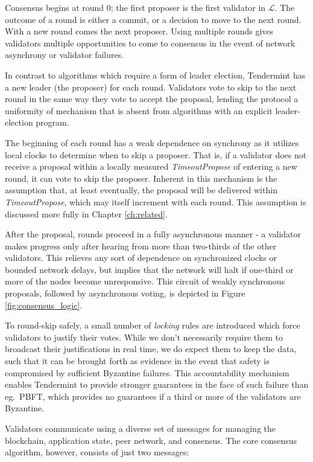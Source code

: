 Consensus begins at round 0; the first proposer is the first validator in $\mathcal{L}$.
The outcome of a round is either a commit, or a decision to move to the next round.
With a new round comes the next proposer.
Using multiple rounds gives validators multiple opportunities 
to come to consensus in the event of network asynchrony or validator failures.

In contrast to algorithms which require a form of leader election, 
Tendermint has a new leader (the proposer) for each round.
Validators vote to skip to the next round in the same way they vote to accept the proposal,
lending the protocol a uniformity of mechanism that is absent 
from algorithms with an explicit leader-election program.

The beginning of each round has a weak dependence on synchrony as it utilizes local clocks to determine when to skip a proposer.
That is, if a validator does not receive a proposal within a locally measured \emph{TimeoutPropose} of entering a new round, it can vote to skip the proposer.
Inherent in this mechanism is the assumption that, at least eventually, the proposal will be delivered within \emph{TimeoutPropose}, which may itself increment with each round.
This assumption is discussed more fully in Chapter \ref{ch:related}.

After the proposal, rounds proceed in a fully asynchronous manner - a validator makes progress only after hearing from more than two-thirds of the other validators.
This relieves any sort of dependence on synchronized clocks or bounded network delays,
but implies that the network will halt if one-third or more of the nodes become unresponsive.
This circuit of weakly synchronous proposals, followed by asynchronous voting, 
is depicted in Figure \ref{fig:consensus_logic}.

To round-skip safely, a small number of \emph{locking} rules 
are introduced which force validators to justify their votes.
While we don't necessarily require them to broadcast their justifications in real time, 
we do expect them to keep the data,
such that it can be brought forth as evidence in the event that safety 
is compromised by sufficient Byzantine failures.
This accountability mechanism enables Tendermint to provide 
stronger guarantees in the face of such failure than eg.~PBFT,
which provides no guarantees if a third or more of the validators are Byzantine.

Validators communicate using a diverse set of messages for managing the blockchain, 
application state, peer network, and consensus.
The core consensus algorithm, however, consists of just two messages:


